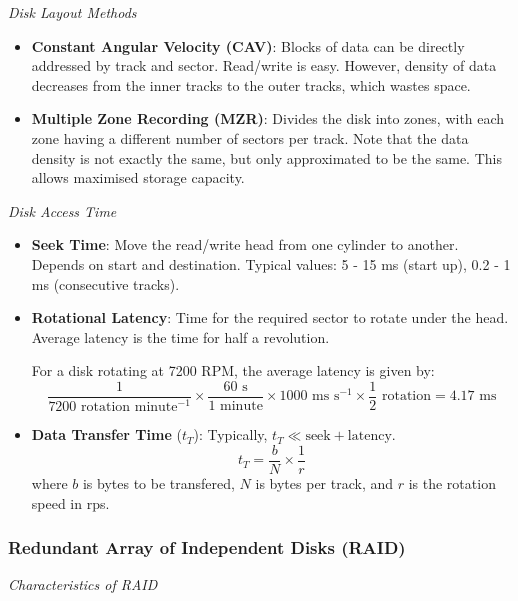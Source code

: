 \emph{Disk Layout Methods}
\begin{itemize}
    \item \textbf{Constant Angular Velocity (CAV)}: Blocks of data can be directly addressed
        by track and sector. Read/write is easy. However, density of data decreases from the
        inner tracks to the outer tracks, which wastes space.
    \item \textbf{Multiple Zone Recording (MZR)}: Divides the disk into zones, with each zone
        having a different number of sectors per track. Note that the data density is not
        exactly the same, but only approximated to be the same. This allows maximised storage
        capacity.
\end{itemize}

\emph{Disk Access Time}

\begin{itemize}
    \item \textbf{Seek Time}: Move the read/write head from one cylinder to another.
        Depends on start and destination. Typical values: 5 - 15 ms (start up), 0.2 - 1 ms
        (consecutive tracks).
    \item \textbf{Rotational Latency}: Time for the required sector to rotate under the head.
        Average latency is the time for half a revolution.
        \begin{example}
            For a disk rotating at 7200 RPM, the average latency is given by: \[
                \frac{1}{7200 \text{ rotation minute}^{-1}}
                \times \frac{60\text{ s}}{1\text{ minute}}
                \times 1000 \text{ ms s}^{-1}
                \times \frac{1}{2} \text{ rotation} = \boxed{4.17 \text{ ms}}
            \]
        \end{example}
    \item \textbf{Data Transfer Time} ($t_T$): Typically, $t_T \ll \text{seek} + \text{latency}$.
        \[
            t_T = \frac{b}{N} \times \frac{1}{r} 
        \]
        where $b$ is bytes to be transfered, $N$ is bytes per track, and $r$ is the rotation
        speed in rps.
\end{itemize}

\subsubsection{Redundant Array of Independent Disks (RAID)}

\emph{Characteristics of RAID}

